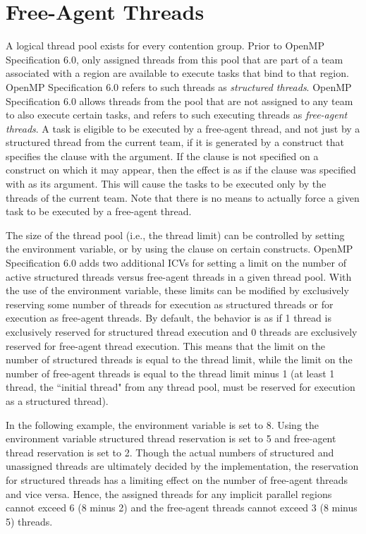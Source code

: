 \section{Free-Agent Threads}
\label{sec:free_agent}

A logical thread pool exists for every contention group. Prior to OpenMP
Specification 6.0, only assigned
threads from this pool that are part of a team associated with a  region are 
available to execute tasks that bind to that  region. OpenMP
Specification 6.0 refers to
such threads as \emph{structured threads}. 
OpenMP Specification 6.0 allows threads from the pool that are not assigned to any team to also execute
certain tasks, and refers to such executing threads as \emph{free-agent threads}. 
A task is eligible to be executed by a free-agent thread, and not just by a structured thread 
from the current team, if it is generated by a construct that specifies the  
clause with the  argument. If the  clause is not specified on a construct 
on which it may appear, then the effect is as if the  clause was specified 
with  as its argument. This will cause the tasks to be executed only by the
threads of the current team.
Note that there is no means to actually force a given task to be executed by a free-agent thread.

The size of the thread pool (i.e., the thread limit) can be controlled by setting the 
 environment variable, or by using the  clause on 
certain constructs. OpenMP Specification 6.0 adds two additional ICVs for setting a limit on the number of active
structured threads versus free-agent threads in a given thread pool. 
With the use of the  environment variable, these limits can be 
modified by exclusively reserving some number of threads for execution as structured threads or 
for execution as free-agent threads. By default, the behavior is as if 1 thread is exclusively 
reserved for structured thread execution and 0 threads are exclusively reserved for free-agent thread 
execution. This means that the limit on the number of structured threads is equal to the thread 
limit, while the limit on the number of free-agent threads is equal to the thread limit 
minus 1 (at least 1 thread, the ``initial thread" from any thread pool, must be reserved for execution 
as a structured thread). 

In the following example, the  environment variable is set to 8. Using the 
environment variable structured thread reservation is set to 5 and free-agent thread reservation is set to 2. 
Though the actual numbers of structured and unassigned threads are ultimately decided by the implementation, 
the reservation for structured threads has a limiting effect on the number of free-agent threads and vice versa. 
Hence, the assigned threads for any implicit parallel regions cannot exceed 6 (8 minus 2) and the 
free-agent threads cannot exceed 3 (8 minus 5) threads.

